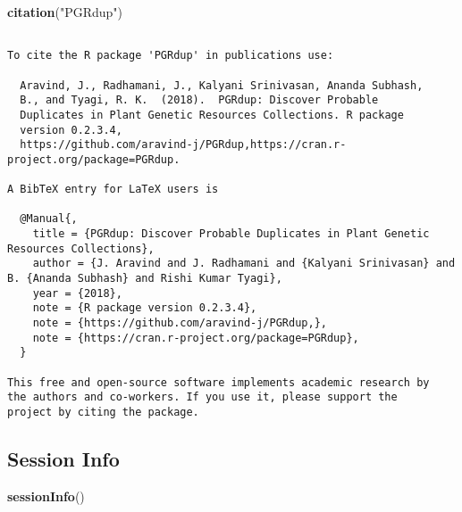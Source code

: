 \documentclass[]{article}
\newenvironment{Shaded}{\begin{snugshade}}{\end{snugshade}}
\newcommand{\KeywordTok}[1]{\textcolor[rgb]{0.13,0.29,0.53}{\textbf{#1}}}
\newcommand{\NormalTok}[1]{#1}
\newcommand{\StringTok}[1]{\textcolor[rgb]{0.31,0.60,0.02}{#1}}
\begin{document}
\begin{Shaded}
\begin{Highlighting}[]
\KeywordTok{citation}\NormalTok{(}\StringTok{"PGRdup"}\NormalTok{)}
\end{Highlighting}
\end{Shaded}

\begin{verbatim}

To cite the R package 'PGRdup' in publications use:

  Aravind, J., Radhamani, J., Kalyani Srinivasan, Ananda Subhash,
  B., and Tyagi, R. K.  (2018).  PGRdup: Discover Probable
  Duplicates in Plant Genetic Resources Collections. R package
  version 0.2.3.4,
  https://github.com/aravind-j/PGRdup,https://cran.r-project.org/package=PGRdup.

A BibTeX entry for LaTeX users is

  @Manual{,
    title = {PGRdup: Discover Probable Duplicates in Plant Genetic Resources Collections},
    author = {J. Aravind and J. Radhamani and {Kalyani Srinivasan} and B. {Ananda Subhash} and Rishi Kumar Tyagi},
    year = {2018},
    note = {R package version 0.2.3.4},
    note = {https://github.com/aravind-j/PGRdup,},
    note = {https://cran.r-project.org/package=PGRdup},
  }

This free and open-source software implements academic research by
the authors and co-workers. If you use it, please support the
project by citing the package.
\end{verbatim}

\hypertarget{session-info}{%
\subsection{Session Info}\label{session-info}}

\begin{Shaded}
\begin{Highlighting}[]
\KeywordTok{sessionInfo}\NormalTok{()}
\end{Highlighting}
\end{Shaded}
\end{document}
